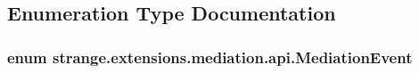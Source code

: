 \subsection{Enumeration Type Documentation}
\hypertarget{namespacestrange_1_1extensions_1_1mediation_1_1api_ae5a81bb1edf9fca1d2aca9f4fada72a8}{
\subsubsection[{Mediation\-Event}]{\setlength{\rightskip}{0pt plus 5cm}enum {\bf strange.\-extensions.\-mediation.\-api.\-Mediation\-Event}}}\label{namespacestrange_1_1extensions_1_1mediation_1_1api_ae5a81bb1edf9fca1d2aca9f4fada72a8}
